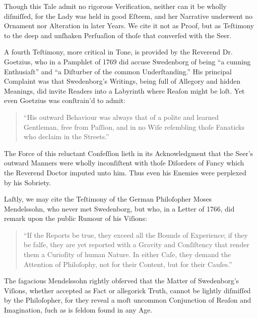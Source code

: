 \documentclass[12pt]{book}
\begin{document}
\noindent
Though this Tale admit no rigorous Verification, neither can it be wholly diſmiſſed, for the Lady was held in good Eſteem, and her Narrative underwent no Ornament nor Alteration in later Years. We cite it not as Proof, but as Teſtimony to the deep and unſhaken Perſuaſion of thoſe that converſed with the Seer.

\vspace{1.2em}

\noindent
A fourth Teſtimony, more critical in Tone, is provided by the Reverend Dr. Goetzius, who in a Pamphlet of 1769 did accuse Swedenborg of being “a cunning Enthusiaſt” and “a Diſturber of the common Underſtanding.” His principal Complaint was that Swedenborg’s Writings, being full of Allegory and hidden Meanings, did invite Readers into a Labyrinth where Reaſon might be loſt. Yet even Goetzius was conſtrain’d to admit:

\begin{quote}
“His outward Behaviour was always that of a polite and learned Gentleman, free from Paſſion, and in no Wiſe reſembling thoſe Fanaticks who declaim in the Streets.”
\end{quote}

\noindent
The Force of this reluctant Confeſſion lieth in its Acknowledgment that the Seer’s outward Manners were wholly inconſiſtent with thoſe Diſorders of Fancy which the Reverend Doctor imputed unto him. Thus even his Enemies were perplexed by his Sobriety.

\vspace{1.2em}

\noindent
Laſtly, we may cite the Teſtimony of the German Philoſopher Moses Mendelssohn, who never met Swedenborg, but who, in a Letter of 1766, did remark upon the public Rumour of his Viſions:

\begin{quote}
“If the Reports be true, they exceed all the Bounds of Experience; if they be falſe, they are yet reported with a Gravity and Conſiſtency that render them a Curioſity of human Nature. In either Caſe, they demand the Attention of Philoſophy, not for their Content, but for their Cauſes.”
\end{quote}

\noindent
The ſagacious Mendelssohn rightly obſerved that the Matter of Swedenborg’s Viſions, whether accepted as Fact or allegorick Truth, cannot be lightly diſmiſſed by the Philoſopher, for they reveal a moſt uncommon Conjunction of Reaſon and Imagination, ſuch as is ſeldom found in any Age.
\end{document}
